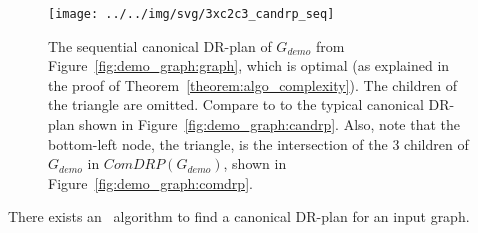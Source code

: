 \begin{figure}\centering%
  \texttt{[image: ../../img/svg/3xc2c3\_candrp\_seq]}
  \caption{The sequential canonical DR-plan of $G_{demo}$ from Figure~\ref{fig:demo_graph:graph}, which is optimal (as explained in the proof of Theorem~\ref{theorem:algo_complexity}). The children of the triangle are omitted. Compare to to the typical canonical DR-plan shown in Figure~\ref{fig:demo_graph:candrp}. Also, note that the bottom-left node, the triangle, is the intersection of the 3 children of $G_{demo}$ in $ComDRP(G_{demo})$, shown in Figure~\ref{fig:demo_graph:comdrp}.}
  \label{fig:demo_graph:candrpseq}
\end{figure}%

\begin{theorem}\label{theorem:algo_complexity}
    There exists an \candrpcomplexityv\ algorithm to find a canonical DR-plan for an input graph.
\end{theorem}

